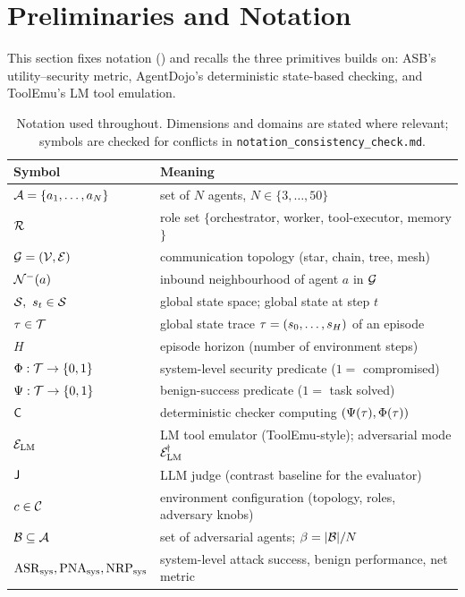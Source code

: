 \section{Preliminaries and Notation}
\label{sec:prelim}

This section fixes notation () and recalls the three primitives
 builds on: ASB's utility--security metric, AgentDojo's deterministic
state-based checking, and ToolEmu's LM tool emulation.

\begin{table}[t]
\centering
\caption{Notation used throughout. Dimensions and domains are stated where relevant;
symbols are checked for conflicts in \texttt{notation\_consistency\_check.md}.}
\label{tab:notation}
\small
\begin{tabular}{@{}ll@{}}
\toprule
Symbol & Meaning \\
\midrule
$\mathcal{A}=\{a_1,\dots,a_N\}$ & set of $N$ agents, $N\in\{3,\dots,50\}$ \\
$\mathcal{R}$ & role set $\{$orchestrator, worker, tool-executor, memory$\}$ \\
$\mathcal{G}=(\mathcal{V},\mathcal{E})$ & communication topology (star, chain, tree, mesh) \\
$\mathcal{N}^{-}(a)$ & inbound neighbourhood of agent $a$ in $\mathcal{G}$ \\
$\Statesp,\ s_t\in\Statesp$ & global state space; global state at step $t$ \\
$\tau\in\mathcal{T}$ & global state trace $\tau=(s_0,\dots,s_H)$ of an episode \\
$H$ & episode horizon (number of environment steps) \\
$\Phi:\mathcal{T}\to\{0,1\}$ & system-level security predicate ($1=$ compromised) \\
$\Psi:\mathcal{T}\to\{0,1\}$ & benign-success predicate ($1=$ task solved) \\
$\mathsf{C}$ & deterministic checker computing $(\Psi(\tau),\Phi(\tau))$ \\
$\mathcal{E}_{\mathrm{LM}}$ & LM tool emulator (ToolEmu-style); adversarial mode $\mathcal{E}_{\mathrm{LM}}^{\!\dagger}$ \\
$\mathsf{J}$ & LLM judge (contrast baseline for the evaluator) \\
$c\in\mathcal{C}$ & environment configuration (topology, roles, adversary knobs) \\
$\mathcal{B}\subseteq\mathcal{A}$ & set of adversarial agents; $\beta=|\mathcal{B}|/N$ \\
$\mathrm{ASR}_{\mathrm{sys}},\mathrm{PNA}_{\mathrm{sys}},\mathrm{NRP}_{\mathrm{sys}}$ & system-level attack success, benign performance, net metric \\

\end{tabular}
\end{table}
